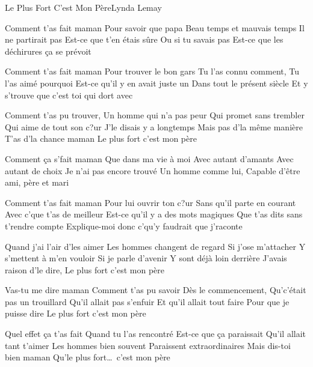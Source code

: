 \documentclass[a4paper,11pt,french]{article}
\begin{document}
\begin{Song}{Le Plus Fort C'est Mon Père}{Lynda Lemay}
\begin{multicols}{2}

\begin{Verse}
Comment t'as fait maman
Pour savoir que papa
Beau temps et mauvais temps
Il ne partirait pas
Est-ce que t'en étais sûre
Ou si tu savais pas
Est-ce que les déchirures ça se prévoit
\espaceInterStrophe

Comment t'as fait maman
Pour trouver le bon gars
Tu l'as connu comment,
Tu l'as aimé pourquoi
Est-ce qu'il y en avait juste un
Dans tout le présent siècle
Et y s'trouve que c'est toi qui dort avec
\end{Verse}
\espaceInterStrophe

\begin{Chorus}
Comment t'as pu trouver,
Un homme qui n'a pas peur
Qui promet sans trembler
Qui aime de tout son c?ur
J'le disais y a longtemps
Mais pas d'la même manière
T'as d'la chance maman
Le plus fort c'est mon père
\end{Chorus}
\espaceInterStrophe

\begin{Verse}
Comment ça s'fait maman
Que dans ma vie à moi
Avec autant d'amants
Avec autant de choix
Je n'ai pas encore trouvé
Un homme comme lui,
Capable d'être ami, père et mari
\columnbreak

Comment t'as fait maman
Pour lui ouvrir ton c?ur
Sans qu'il parte en courant
Avec c'que t'as de meilleur
Est-ce qu'il y a des mots magiques
Que t'as dits sans t'rendre compte
Explique-moi donc c'qu'y faudrait que j'raconte
\end{Verse}
\espaceInterStrophe

\begin{Chorus}
Quand j'ai l'air d'les aimer
Les hommes changent de regard
Si j'ose m'attacher
Y s'mettent à m'en vouloir
Si je parle d'avenir
Y sont déjà loin derrière
J'avais raison d'le dire,
Le plus fort c'est mon père
\espaceInterStrophe

Vas-tu me dire maman
Comment t'as pu savoir
Dès le commencement,
Qu'c'était pas un trouillard
Qu'il allait pas s'enfuir
Et qu'il allait tout faire
Pour que je puisse dire
Le plus fort c'est mon père
\end{Chorus}
\espaceInterStrophe

\begin{Verse}
Quel effet ça t'as fait
Quand tu l'as rencontré
Est-ce que ça paraissait
Qu'il allait tant t'aimer
Les hommes bien souvent
Paraissent extraordinaires
Mais dis-toi bien maman
Qu'le plus fort\dots\ c'est mon père
\end{Verse}


\end{multicols}
\end{Song}
\end{document}
